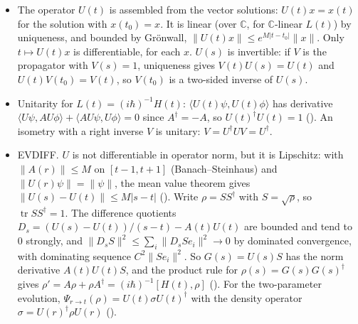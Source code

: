 \documentclass[11pt]{article}
\begin{document}
\begin{itemize}
  theorem asks for, and for a bound on $\|L(t)\|$ over a compact interval. That bound now comes
  from the Banach--Steinhaus theorem (), since
  $t \mapsto \|L(t)x\|$ is bounded on the interval for each $x$. The rest of the vector-level
  proof is unchanged.
\item The operator $U(t)$ is assembled from the vector solutions: $U(t)x = x(t)$ for the
  solution with $x(t_0) = x$. It is linear (over $\mathbb{C}$, for $\mathbb{C}$-linear $L(t)$)
  by uniqueness, and bounded by Gr\"onwall, $\|U(t)x\| \le e^{M|t - t_0|}\|x\|$. Only
  $t \mapsto U(t)x$ is differentiable, for each $x$. $U(s)$ is invertible: if $V$ is the
  propagator with $V(s) = 1$, uniqueness gives $V(t)U(s) = U(t)$ and $U(t)V(t_0) = V(t)$, so
  $V(t_0)$ is a two-sided inverse of $U(s)$.
\item Unitarity for $L(t) = (i\hbar)^{-1}H(t)$: $\langle U(t)\psi, U(t)\phi\rangle$ has
  derivative $\langle U\psi, AU\phi\rangle + \langle AU\psi, U\phi\rangle = 0$ since
  $A^\dagger = -A$, so $U(t)^\dagger U(t) = 1$
  (). An isometry with a right inverse $V$ is unitary:
  $V = U^\dagger UV = U^\dagger$.
\item EVDIFF. $U$ is not differentiable in operator norm, but it is Lipschitz: with
  $\|A(r)\| \le M$ on $[t-1, t+1]$ (Banach--Steinhaus) and $\|U(r)\psi\| = \|\psi\|$, the mean
  value theorem gives $\|U(s) - U(t)\| \le M|s - t|$ ().
  Write $\rho = SS^\dagger$ with $S = \sqrt\rho$, so $\operatorname{tr} SS^\dagger = 1$. The
  difference quotients $D_s = (U(s) - U(t))/(s - t) - A(t)U(t)$ are bounded and tend to $0$
  strongly, and $\|D_sS\|^2 \le \sum_i \|D_s S e_i\|^2 \to 0$ by dominated convergence, with
  dominating sequence $C^2\|Se_i\|^2$. So $G(s) = U(s)S$ has the norm derivative
  $A(t)U(t)S$, and the product rule for $\rho(s) = G(s)G(s)^\dagger$ gives
  $\rho' = A\rho + \rho A^\dagger = (i\hbar)^{-1}[H(t), \rho]$
  (). For the two-parameter evolution,
  $\Psi_{r\to t}(\rho) = U(t)\sigma U(t)^\dagger$ with the density operator
  $\sigma = U(r)^\dagger\rho U(r)$ ().
\end{itemize}
\end{document}
